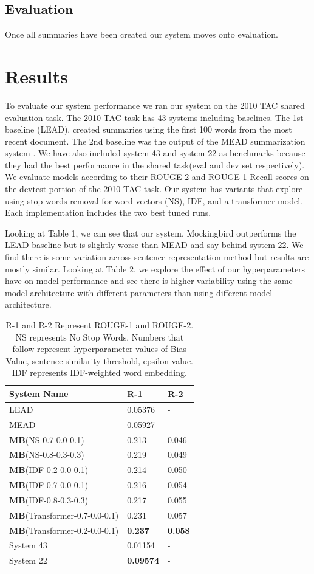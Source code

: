 \documentclass[11pt,a4paper]{article}
\begin{document}
\subsection{Evaluation}
Once all summaries have been created our system moves onto evaluation. 
\section{Results}
To evaluate our system performance we ran our system on the 2010 TAC shared evaluation task. The 2010 TAC task has 43 systems including baselines. The 1st baseline (LEAD), created summaries using the first 100 words from the most recent document. The 2nd baseline was the output of the MEAD summarization system \cite{Radev2003MEADRM}. We have also included system 43 and system 22 as benchmarks because they had the best performance in the shared task(eval and dev set respectively). We evaluate models according to their ROUGE-2 and ROUGE-1 Recall scores on the devtest portion of the 2010 TAC task. Our system has variants that explore using stop words removal for word vectors (NS), IDF, and a transformer model. Each implementation includes the two best tuned runs.

Looking at Table 1, we can see that our system, Mockingbird outperforms the LEAD baseline but is slightly worse than MEAD and say behind system 22. We find there is some variation across sentence representation method but results are mostly similar. Looking at Table 2, we explore the effect of our hyperparameters have on model performance and see there is higher variability using the same model architecture with different parameters than using different model architecture.
\begin{table}[h]
\begin{tabular}{|l|l|l|} \hline
\textbf{System Name} & \textbf{R-1} & \textbf{R-2}\\ \hline
LEAD & 0.05376 & - \\ \hline
MEAD & 0.05927 &  -\\ \hline
\textbf{MB}(NS-0.7-0.0-0.1) & 0.213 & 0.046 \\ \hline
\textbf{MB}(NS-0.8-0.3-0.3) & 0.219 & 0.049 \\ \hline
\textbf{MB}(IDF-0.2-0.0-0.1) & 0.214  & 0.050 \\ \hline
\textbf{MB}(IDF-0.7-0.0-0.1) & 0.216  & 0.054 \\ \hline
\textbf{MB}(IDF-0.8-0.3-0.3) & 0.217  & 0.055 \\ \hline
\textbf{MB}(Transformer-0.7-0.0-0.1) & 0.231  & 0.057 \\ \hline
\textbf{MB}(Transformer-0.2-0.0-0.1) & \textbf{0.237}  & \textbf{0.058} \\ \hline
System 43 & 0.01154 & -\\ \hline
System 22 & \textbf{0.09574} & - \\ \hline
\end{tabular}
\label{table:1}
\caption{R-1 and R-2 Represent ROUGE-1 and ROUGE-2. NS represents No Stop Words. Numbers that follow represent hyperparameter values of Bias Value, sentence similarity threshold, epsilon value. IDF represents IDF-weighted word embedding.}
\end{table}
\end{document}
